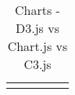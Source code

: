 \documentclass[draftclsnofoot,onecolumn,letterpaper,10pt,compsoc]{IEEEtran}
\begin{document}
\begin{landscape}
  \begin{table}[]
  \centering
  \caption{Charts - D3.js vs Chart.js vs C3.js}
  \label{my-label}
    \begin{tabular}{lllll}
      &  &  &  & \\
    \end{tabular}
  \end{table}
\end{landscape}

\clearpage

{}

\end{document}
